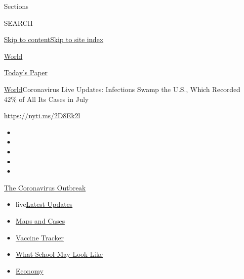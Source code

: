 Sections

SEARCH

\protect\hyperlink{site-content}{Skip to
content}\protect\hyperlink{site-index}{Skip to site index}

\href{https://www.nytimes.com/section/world}{World}

\href{https://myaccount.nytimes.com/auth/login?response_type=cookie\&client_id=vi}{}

\href{https://www.nytimes.com/section/todayspaper}{Today's Paper}

\href{/section/world}{World}\textbar{}Coronavirus Live Updates:
Infections Swamp the U.S., Which Recorded 42\% of All Its Cases in July

\url{https://nyti.ms/2D8Ek2l}

\begin{itemize}
\item
\item
\item
\item
\item
\end{itemize}

\href{https://www.nytimes.com/news-event/coronavirus?action=click\&pgtype=Article\&state=default\&region=TOP_BANNER\&context=storylines_menu}{The
Coronavirus Outbreak}

\begin{itemize}
\tightlist
\item
  live\href{https://www.nytimes.com/2020/08/01/world/coronavirus-covid-19.html?action=click\&pgtype=Article\&state=default\&region=TOP_BANNER\&context=storylines_menu}{Latest
  Updates}
\item
  \href{https://www.nytimes.com/interactive/2020/us/coronavirus-us-cases.html?action=click\&pgtype=Article\&state=default\&region=TOP_BANNER\&context=storylines_menu}{Maps
  and Cases}
\item
  \href{https://www.nytimes.com/interactive/2020/science/coronavirus-vaccine-tracker.html?action=click\&pgtype=Article\&state=default\&region=TOP_BANNER\&context=storylines_menu}{Vaccine
  Tracker}
\item
  \href{https://www.nytimes.com/interactive/2020/07/29/us/schools-reopening-coronavirus.html?action=click\&pgtype=Article\&state=default\&region=TOP_BANNER\&context=storylines_menu}{What
  School May Look Like}
\item
  \href{https://www.nytimes.com/live/2020/07/31/business/stock-market-today-coronavirus?action=click\&pgtype=Article\&state=default\&region=TOP_BANNER\&context=storylines_menu}{Economy}
\end{itemize}

